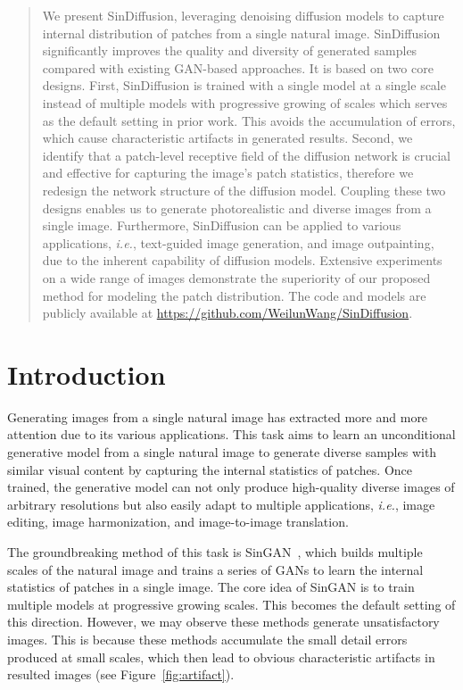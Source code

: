 \documentclass[10pt,twocolumn,letterpaper]{article}
\begin{document}
\begin{abstract}
\vspace{-3.4mm}
We present SinDiffusion, leveraging denoising diffusion models to capture internal distribution of patches from a single natural image. 
SinDiffusion significantly improves the quality and diversity of generated samples compared with existing GAN-based approaches. It is based on two core designs. First, SinDiffusion is trained with a single model at a single scale instead of multiple models with progressive growing of scales which serves as the default setting in prior work. This avoids the accumulation of errors, which cause characteristic artifacts in generated results. Second, we identify that a patch-level receptive field of the diffusion network is crucial and effective for capturing the image’s patch statistics, therefore we redesign the network structure of the diffusion model. Coupling these two designs enables us to generate photorealistic and diverse images from a single image. Furthermore, SinDiffusion can be applied to various applications, \emph{i.e.}, text-guided image generation, and image outpainting, due to the inherent capability of diffusion models.
Extensive experiments on a wide range of images demonstrate the superiority of our proposed method for modeling the patch distribution. 
The code and models are publicly available at \url{https://github.com/WeilunWang/SinDiffusion}.
\end{abstract}

\vspace{-1mm}
\section{Introduction}
\label{sec:intro}
Generating images from a single natural image has extracted more and more attention due to its various applications.
This task aims to learn an unconditional generative model from a single natural image to generate diverse samples with similar visual content by capturing the internal statistics of patches.
Once trained, the generative model can not only produce high-quality diverse images of arbitrary resolutions but also easily adapt to multiple applications, \emph{i.e.}, image editing, image harmonization, and image-to-image translation.

The groundbreaking method of this task is SinGAN~\cite{shaham2019singan}, which builds multiple scales of the natural image and trains a series of GANs to learn the internal statistics of patches in a single image. The core idea of SinGAN is to train multiple models at progressive growing scales. This becomes the default setting of this direction.
However, we may observe these methods generate unsatisfactory images. This is because these methods accumulate the small detail errors produced at small scales, which then lead to obvious characteristic artifacts in resulted images (see Figure~\ref{fig:artifact}).
\end{document}
